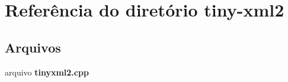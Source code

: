 \section{Referência do diretório tiny-\/xml2}
\label{dir_6a418ba3ea1b4c613f0e6f13e9932b7b}
\subsection*{Arquivos}
\begin{DoxyCompactItemize}
\item 
arquivo {\bf tinyxml2.\+cpp}
\end{DoxyCompactItemize}
